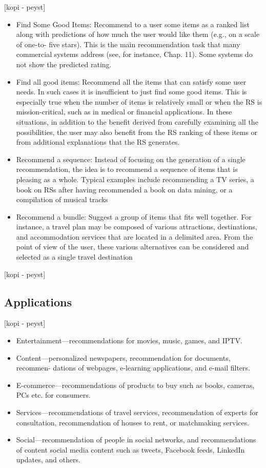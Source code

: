[kopi - peyst]
\begin{itemize}
	\item Find Some Good Items: Recommend to a user some items as a ranked list along with predictions of how much the user would like them (e.g., on a scale of one-to- five stars). This is the main recommendation task that many commercial systems address (see, for instance, Chap. 11). Some systems do not show the predicted rating.
	\item Find all good items: Recommend all the items that can satisfy some user needs. In such cases it is insufficient to just find some good items. This is especially true when the number of items is relatively small or when the RS is mission-critical, such as in medical or financial applications. In these situations, in addition to the benefit derived from carefully examining all the possibilities, the user may also benefit from the RS ranking of these items or from additional explanations that the RS generates.
	\item Recommend a sequence: Instead of focusing on the generation of a single recommendation, the idea is to recommend a sequence of items that is pleasing as a whole. Typical examples include recommending a TV series, a book on RSs after having recommended a book on data mining, or a compilation of musical tracks
	\item Recommend a bundle: Suggest a group of items that fits well together. For instance, a travel plan may be composed of various attractions, destinations, and accommodation services that are located in a delimited area. From the point of view of the user, these various alternatives can be considered and selected as a single travel destination
\end{itemize}
[kopi - peyst]

\subsection{Applications}
[kopi - peyst]

\begin{itemize}
\item Entertainment—recommendations for movies, music, games, and IPTV.
\item Content—personalized newspapers, recommendation for documents, recommen-
dations of webpages, e-learning applications, and e-mail filters.
\item E-commerce—recommendations of products to buy such as books, cameras, PCs
etc. for consumers.
\item Services—recommendations of travel services, recommendation of experts for
consultation, recommendation of houses to rent, or matchmaking services.
\item Social—recommendation of people in social networks, and recommendations of content social media content such as tweets, Facebook feeds, LinkedIn updates,
and others.
\end{itemize}

